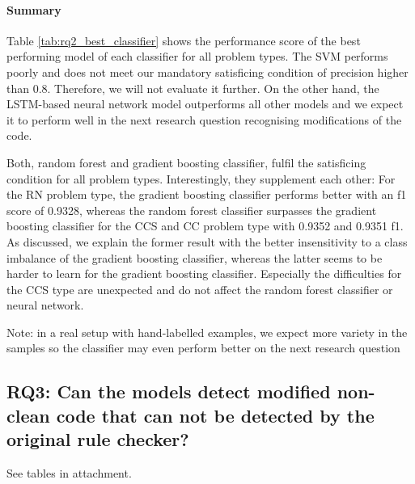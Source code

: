 \paragraph{Summary}

 Table \ref{tab:rq2_best_classifier} shows the performance score of the best performing model of each classifier for all problem types.
 The SVM performs poorly and does not meet our mandatory satisficing condition of precision higher than 0.8. Therefore, we will not evaluate it further. On the other hand, the LSTM-based neural network model outperforms all other models and we expect it to perform well in the next research question recognising modifications of the code.

 Both, random forest and gradient boosting classifier, fulfil the satisficing condition for all problem types. Interestingly, they supplement each other: For the RN problem type, the gradient boosting classifier performs better with an f1 score of 0.9328, whereas the random forest classifier surpasses the gradient boosting classifier for the CCS and CC problem type with 0.9352 and 0.9351 f1. As discussed, we explain the former result with the better insensitivity to a class imbalance of the gradient boosting classifier, whereas the latter seems to be harder to learn for the gradient boosting classifier. Especially the difficulties for the CCS type are unexpected and do not affect the random forest classifier or neural network.
 
 Note: in a real setup with hand-labelled examples, we expect more variety in the samples so the classifier may even perform better on the next research question 


 \subsection{RQ3: Can the models detect modified non-clean code that can not be detected by the original rule checker? }
See tables in attachment.

